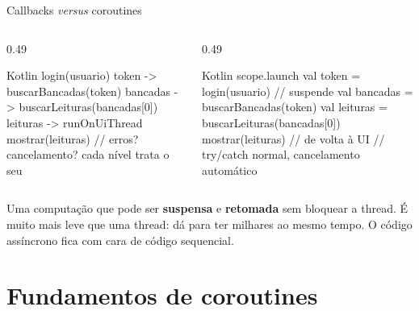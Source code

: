 \documentclass[aspectratio=169,10pt]{beamer}
\begin{document}
\begin{frame}[fragile]{Callbacks \emph{versus} coroutines}
  \begin{columns}[T]
    \begin{column}{0.49\textwidth}
\begin{codigo}[title=Callbacks (\emph{callback hell})]{Kotlin}
login(usuario) { token ->
  buscarBancadas(token) { bancadas ->
    buscarLeituras(bancadas[0]) { leituras ->
      runOnUiThread {
        mostrar(leituras)
      }
    }
  }
}
// erros? cancelamento? cada nível trata o seu
\end{codigo}
    \end{column}
    \begin{column}{0.49\textwidth}
\begin{codigo}[title=Coroutines]{Kotlin}
scope.launch {
  val token = login(usuario)          // suspende
  val bancadas = buscarBancadas(token)
  val leituras = buscarLeituras(bancadas[0])
  mostrar(leituras)                   // de volta à UI
}
// try/catch normal, cancelamento automático
\end{codigo}
    \end{column}
  \end{columns}
  \begin{conceito}[Coroutine]
    Uma computação que pode ser \textbf{suspensa} e \textbf{retomada} sem bloquear a thread. É muito mais leve que uma thread: dá para ter milhares ao mesmo tempo. O código assíncrono fica com cara de código sequencial.
  \end{conceito}
\end{frame}

\section{Fundamentos de coroutines}
\end{document}
